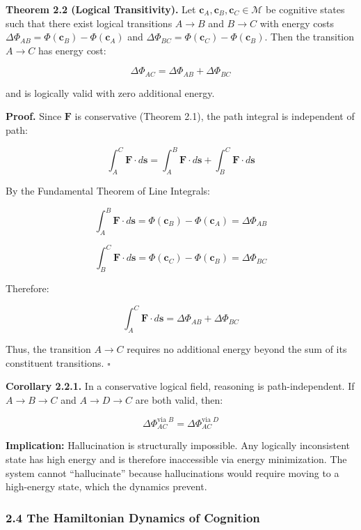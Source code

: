 \documentclass[
  11pt,
  a4paper,
]{article}
\begin{document}
\textbf{Theorem 2.2 (Logical Transitivity).} Let
\(\mathbf{c}_A, \mathbf{c}_B, \mathbf{c}_C \in \mathcal{M}\) be
cognitive states such that there exist logical transitions \(A \to B\)
and \(B \to C\) with energy costs
\(\Delta \Phi_{AB} = \Phi(\mathbf{c}_B) - \Phi(\mathbf{c}_A)\) and
\(\Delta \Phi_{BC} = \Phi(\mathbf{c}_C) - \Phi(\mathbf{c}_B)\). Then the
transition \(A \to C\) has energy cost:

\[\Delta \Phi_{AC} = \Delta \Phi_{AB} + \Delta \Phi_{BC}\]

and is logically valid with zero additional energy.

\textbf{Proof.} Since \(\mathbf{F}\) is conservative (Theorem 2.1), the
path integral is independent of path:

\[\int_A^C \mathbf{F} \cdot d\mathbf{s} = \int_A^B \mathbf{F} \cdot d\mathbf{s} + \int_B^C \mathbf{F} \cdot d\mathbf{s}\]

By the Fundamental Theorem of Line Integrals:

\[\int_A^B \mathbf{F} \cdot d\mathbf{s} = \Phi(\mathbf{c}_B) - \Phi(\mathbf{c}_A) = \Delta \Phi_{AB}\]

\[\int_B^C \mathbf{F} \cdot d\mathbf{s} = \Phi(\mathbf{c}_C) - \Phi(\mathbf{c}_B) = \Delta \Phi_{BC}\]

Therefore:

\[\int_A^C \mathbf{F} \cdot d\mathbf{s} = \Delta \Phi_{AB} + \Delta \Phi_{BC}\]

Thus, the transition \(A \to C\) requires no additional energy beyond
the sum of its constituent transitions. \(\square\)

\textbf{Corollary 2.2.1.} In a conservative logical field, reasoning is
path-independent. If \(A \to B \to C\) and \(A \to D \to C\) are both
valid, then:

\[\Delta \Phi_{AC}^{\text{via }B} = \Delta \Phi_{AC}^{\text{via }D}\]

\textbf{Implication:} Hallucination is structurally impossible. Any
logically inconsistent state has high energy and is therefore
inaccessible via energy minimization. The system cannot ``hallucinate''
because hallucinations would require moving to a high-energy state,
which the dynamics prevent.

\subsubsection{2.4 The Hamiltonian Dynamics of
Cognition}\label{the-hamiltonian-dynamics-of-cognition}
\end{document}
